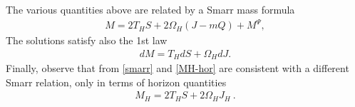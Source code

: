 %
The various quantities above are related by a Smarr mass formula 
%
\begin{eqnarray}
\label{smarr}
M=2 T_H S +2\Omega_H (J-m Q) + M^\Psi,
\end{eqnarray}
The solutions satisfy also the 1st law 
%
\begin{eqnarray}
\label{first-law}
dM=T_H dS +\Omega_H dJ  .
\end{eqnarray}
%
Finally, observe that from \eqref{smarr} and \eqref{MH-hor} are consistent with a different Smarr relation, only in terms of horizon quantities  
%
%
\begin{eqnarray} 
\label{rel-hor}
M_H=2T_H S+2 \Omega_H J_H~.
\end{eqnarray}
